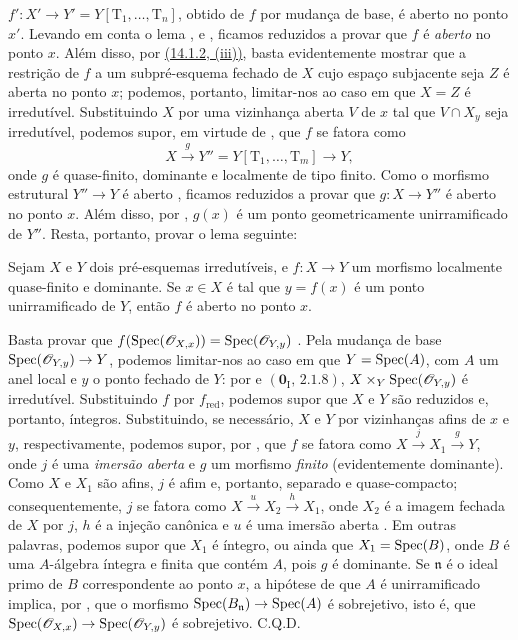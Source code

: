 
$f':X'\to Y'=Y[\mathrm{T}_1,\ldots,\mathrm{T}_n]$, obtido de $f$ por mudança de base, é aberto no ponto $x'$.
Levando em conta o lema ,  e , ficamos reduzidos a provar que $f$ é \emph{aberto} no ponto $x$.
Além disso, por {\hyperlink{ega4.c04.prop.14-1-2}{(14.1.2, (iii))}}, basta evidentemente mostrar que a restrição de $f$ a um subpré-esquema fechado de $X$ cujo espaço subjacente seja $Z$ é aberta no ponto $x$; podemos, portanto, limitar-nos ao caso em que $X=Z$ é irredutível.
Substituindo $X$ por uma vizinhança aberta $V$ de $x$ tal que $V\cap X_y$ seja irredutível, podemos supor, em virtude de , que $f$ se fatora como
\[
  X\xrightarrow{g}Y''=Y[\mathrm{T}_1,\ldots,\mathrm{T}_m]\to Y,
\]
onde $g$ é quase-finito, dominante e localmente de tipo finito.
Como o morfismo estrutural $Y''\to Y$ é aberto , ficamos reduzidos a provar que $g:X\to Y''$ é aberto no ponto $x$.
Além disso, por , $g(x)$ é um ponto geometricamente unirramificado de $Y''$.
Resta, portanto, provar o lema seguinte:

\begin{lemma}[14.4.1.3]
\label{IV.14.4.1.3}
Sejam $X$ e $Y$ dois pré-esquemas irredutíveis, e $f:X\to Y$ um morfismo localmente quase-finito e dominante.
Se $x\in X$ é tal que $y=f(x)$ é um ponto unirramificado de $Y$, então $f$ é aberto no ponto $x$.
\end{lemma}

Basta provar que $f(\operatorname{Spec}(\mathscr{O}_{X,x}))=\operatorname{Spec}(\mathscr{O}_{Y,y})$ .
Pela mudança de base $\Spec(\sh{O}_{Y,y})\to Y$, podemos limitar-nos ao caso em que $Y=\operatorname{Spec}(A)$, com $A$ um anel local e $y$ o ponto fechado de $Y$: por  e $(\mathbf{0}_{\mathrm I},\,2.1.8)$, $X\times_Y\operatorname{Spec}(\mathscr{O}_{Y,y})$ é irredutível.
Substituindo $f$ por $f_{\mathrm{red}}$, podemos supor que $X$ e $Y$ são reduzidos e, portanto, íntegros.
Substituindo, se necessário, $X$ e $Y$ por vizinhanças afins de $x$ e $y$, respectivamente, podemos supor, por , que $f$ se fatora como $X\xrightarrow{j}X_1\xrightarrow{g}Y$, onde $j$ é uma \emph{imersão aberta} e $g$ um morfismo \emph{finito} (evidentemente dominante).
Como $X$ e $X_1$ são afins, $j$ é afim e, portanto, separado e quase-compacto; consequentemente, $j$ se fatora como $X\xrightarrow{u}X_2\xrightarrow{h}X_1$, onde $X_2$ é a imagem fechada de $X$ por $j$, $h$ é a injeção canônica e $u$ é uma imersão aberta .
Em outras palavras, podemos supor que $X_1$ é íntegro, ou ainda que $X_1=\operatorname{Spec}(B)$, onde $B$ é uma $A$-álgebra íntegra e finita que contém $A$, pois $g$ é dominante.
Se $\mathfrak n$ é o ideal primo de $B$ correspondente ao ponto $x$, a hipótese de que $A$ é unirramificado implica, por , que o morfismo $\Spec(B_{\mathfrak n})\to\Spec(A)$ é sobrejetivo, isto é, que $\Spec(\sh{O}_{X,x})\to\Spec(\sh{O}_{Y,y})$ é sobrejetivo.
C.Q.D.

